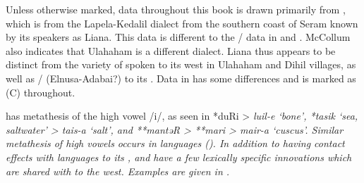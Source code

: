 Unless otherwise marked,  data throughout this book is drawn
primarily from \citet{McCollum-Grimes1990},
which is from the Lapela-Kedalil dialect from the southern coast
of Seram known by its speakers as Liana.
This data is different to the / data in \citet{Wallace1869}
and  \citet{Stresemann1927}.
McCollum also indicates that Ulahaham is a different dialect.
Liana thus appears to be distinct from the variety of 
spoken to its west in Ulahaham
and Dihil villages, as well as / (Elnusa-Adabai?) to its .
Data in \citet{Collins1986} has some differences
and is marked as (C) throughout.

 has metathesis of the high vowel /i/,
as seen in *duRi > \it{luil-e} ‘bone’,
*tasik ‘sea, saltwater’ > \it{tais-a} ‘salt’,
and **mantəR > **mari > \it{mair-a} ‘cuscus’.
Similar metathesis of high vowels occurs in  languages ().
In addition to having contact effects with  languages
to its ,  and  have a few lexically specific innovations
which are shared with  to the west.
Examples are given in .



